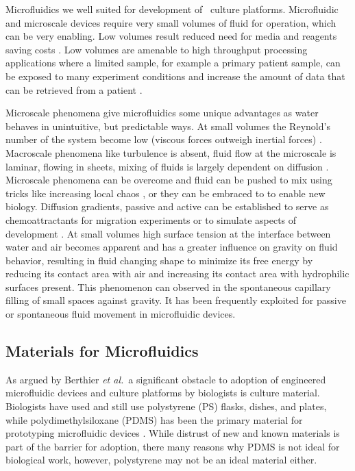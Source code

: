Microfluidics we well suited for development of \invitro\ culture platforms. Microfluidic and microscale devices require very small volumes of fluid for operation, which can be very enabling. Low volumes result reduced need for media and reagents saving costs \cite{Ohno2008a, Situma2006}. Low volumes are amenable to high throughput processing applications where a limited sample, for example a primary patient sample, can be exposed to many experiment conditions and increase the amount of data that can be retrieved from a patient \cite{Young2012}. 

Microscale phenomena give microfluidics some unique advantages as water behaves in unintuitive, but predictable ways. At small volumes the Reynold's number of the system become low (viscous forces outweigh inertial forces) \cite{Beebe2002a}. Macroscale phenomena like turbulence is absent, fluid flow at the microscale is laminar, flowing in sheets, mixing of fluids is largely dependent on diffusion \cite{purcell1977life}. Microscale phenomena can be overcome and fluid can be pushed to mix using tricks like increasing local chaos \cite{DeMello2006, Stroock2004}, or they can be embraced to to enable new \invitro biology. Diffusion gradients, passive and active can be established to serve as chemoattractants \cite{Keenan2008} for migration experiments or to simulate aspects of development \cite{Berthier2014a}. At small volumes high surface tension at the interface between water and air becomes apparent and has a greater influence on gravity on fluid behavior, resulting in fluid changing shape to minimize its free energy by reducing its contact area with air and increasing its contact area with hydrophilic surfaces present. This phenomenon can observed in the spontaneous capillary filling of small spaces against gravity. It has been frequently exploited for passive or spontaneous fluid movement in microfluidic devices.

\subsection{Materials for Microfluidics}
As argued by Berthier \textit{et al.}\ a significant obstacle to adoption of engineered microfluidic devices and culture platforms by biologists is culture material. Biologists have used and still use polystyrene (PS) flasks, dishes, and plates, while polydimethylsiloxane (PDMS) has been the primary material for prototyping microfluidic devices \cite{Berthier2012}. While distrust of new and known materials is part of the barrier for adoption, there many reasons why PDMS is not ideal for biological work, however, polystyrene may not be an ideal material either.

